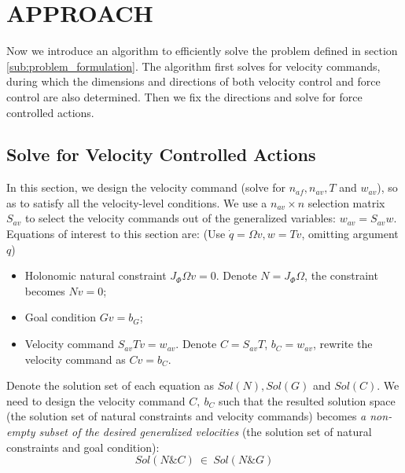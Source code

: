 
\section{APPROACH}
\label{sec:approach}
Now we introduce an algorithm to efficiently solve the problem defined in section \ref{sub:problem_formulation}. The algorithm first solves for velocity commands, during which the dimensions and directions of both velocity control and force control are also determined. Then we fix the directions and solve for force controlled actions.

\subsection{Solve for Velocity Controlled Actions} %
\label{sub:solve_for_velocity_controlled_actions}
In this section, we design the velocity command (solve for $n_{af}, n_{av}, T$ and $w_{av}$), so as to satisfy all the velocity-level conditions.
We use a $n_{av}\times n$ selection matrix $S_{av}$ to select the velocity commands out of the generalized variables: $w_{av}=S_{av}w$. Equations of interest to this section are:
(Use $\dot q=\Omega v, w=Tv$, omitting argument $q$)
\begin{itemize}
  \item Holonomic natural constraint $J_\Phi\Omega v=0$. Denote $N=J_\Phi\Omega$, the constraint becomes $Nv=0$;
  \item Goal condition $Gv=b_G$;
  \item Velocity command $S_{av}Tv=w_{av}$. Denote $C=S_{av}T$, $b_C=w_{av}$, rewrite the velocity command as $Cv=b_C$.
\end{itemize}
Denote the solution set of each equation as $Sol(N), Sol(G)$ and $Sol(C)$. We need to design the velocity command $C,\ b_C$ such that the resulted solution space (the solution set of natural constraints and velocity commands) becomes \textit{a non-empty subset of the desired generalized velocities} (the solution set of natural constraints and goal condition):
\begin{equation}
Sol(N\&C)\ \in\ Sol(N\&G)
\end{equation}

